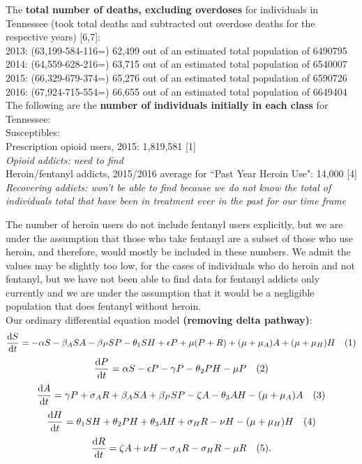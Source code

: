 \documentclass[12pt]{article}
\begin{document}

The \textbf{total number of deaths, excluding overdoses} for individuals in Tennessee (took total deaths and subtracted out overdose deaths for the respective years) [6,7]: \\
2013: (63,199-584-116=) 62,499 out of an estimated total population of 6490795 \\
2014: (64,559-628-216=) 63,715 out of an estimated total population of 6540007 \\
2015: (66,329-679-374=) 65,276 out of an estimated total population of 6590726 \\
2016: (67,924-715-554=) 66,655 out of an estimated total population of 6649404 \\


The following are the \textbf{number of individuals initially in each class} for Tennessee: \\
Susceptibles: \\
Prescription opioid users, 2015: 1,819,581 [1] \\
\textit{Opioid addicts: need to find}  \\ %
Heroin/fentanyl addicts, 2015/2016 average for ``Past Year Heroin Use": 14,000 [4] \\
\textit{Recovering addicts: won't be able to find because we do not know the total of individuals total that have been in treatment ever in the past for our time frame}  

The number of heroin users do not include fentanyl users explicitly, but we are under the assumption that those who take fentanyl are a subset of those who use heroin, and therefore, would mostly be included in these numbers. We admit the values may be slightly too low, for the cases of individuals who do heroin and not fentanyl, but we have not been able to find data for fentanyl addicts only currently and we are under the assumption that it would be a negligible population that does fentanyl without heroin. \\

Our ordinary differential equation model \textbf{(removing delta pathway)}: 
\[\dv{S}{t} = -\alpha S - \beta_{A} SA  -\beta_{P} SP- \theta_{1} SH +\epsilon P +\mu (P+R) + (\mu+\mu_{A})A + (\mu+\mu_{H}) H \quad (1)\] 
\[\dv{P}{t} = \alpha S - \epsilon P  - \gamma P - \theta_{2}PH- \mu P    \quad(2)\]
\[\dv{A}{t} = \gamma P + \sigma_{A} R +\beta_{A} SA  +\beta_{P} SP -\zeta A - \theta_{3}AH-(\mu + \mu_{A})A   \quad (3)\]
\[\dv{H}{t} = \theta_{1}SH+\theta_{2}PH+\theta_{3}AH + \sigma_{H}R-\nu H-(\mu+\mu_{H})H  \quad (4)\]
\[\dv{R}{t} = \zeta A +\nu H -\sigma_{A}R-\sigma_{H}R -\mu R\quad(5).\]
\end{document}
